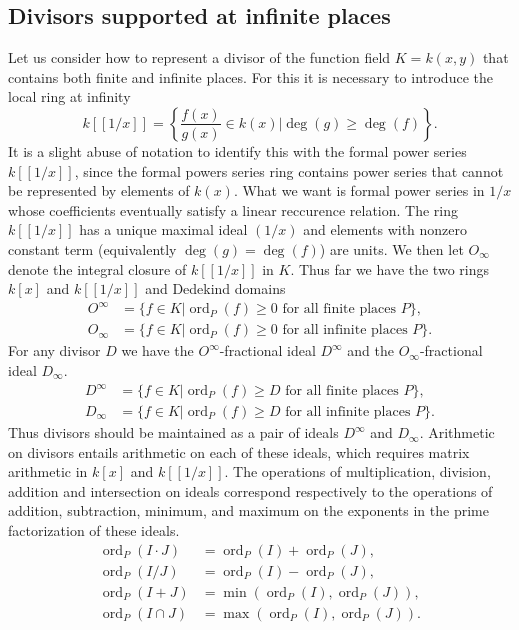 \documentclass[12pt,reqno]{amsart}
\numberwithin{equation}{section}
\begin{document}
\subsection{Divisors supported at infinite places}
\label{section_infdiv}
Let us consider how to represent a divisor of the function field $K=k(x,y)$ that contains both finite and infinite places. For this it is necessary to introduce the local ring at infinity
\begin{equation*}
 k[[1/x]] = \left\{ \frac{f(x)}{g(x)}\in k(x) \Big|\operatorname{deg}(g) \ge \operatorname{deg}(f) \right\}\text{.}
\end{equation*}
It is a slight abuse of notation to identify this with the formal power series $k[[1/x]]$, since the formal powers series ring contains power series that cannot be represented by elements of $k(x)$. What we want is formal power series in $1/x$ whose coefficients eventually satisfy a linear reccurence relation. The ring $k[[1/x]]$ has a unique maximal ideal $(1/x)$ and elements with nonzero constant term (equivalently $\operatorname{deg}(g) = \operatorname{deg}(f)$) are units. We then let $O_{\infty}$ denote the integral closure of $k[[1/x]]$ in $K$. Thus far we have the two rings $k[x]$ and $k[[1/x]]$ and Dedekind domains
\begin{align*}
 O^{\infty} &= \{ f \in K | \operatorname{ord}_P(f) \ge 0 \text{ for all finite places } P\}\text{,}\\
 O_{\infty} &= \{ f \in K | \operatorname{ord}_P(f) \ge 0 \text{ for all infinite places } P\}\text{.}
\end{align*}
For any divisor $D$ we have the $O^{\infty}$-fractional ideal $D^{\infty}$ and the $O_{\infty}$-fractional ideal $D_{\infty}$.
\begin{equation}
\label{def_idealsD}
\begin{alignedat}{3}
 D^{\infty} &= \{ f \in K | \operatorname{ord}_P(f) \ge D \text{ for all finite places } P\}\text{,}\\
 D_{\infty} &= \{ f \in K | \operatorname{ord}_P(f) \ge D \text{ for all infinite places } P\}\text{.}
\end{alignedat} 
\end{equation}
Thus divisors should be maintained as a pair of ideals $D^{\infty}$ and $D_{\infty}$. Arithmetic on divisors entails arithmetic on each of these ideals, which requires matrix arithmetic in $k[x]$ and $k[[1/x]]$. The operations of multiplication, division, addition and intersection on ideals correspond respectively to the operations of addition, subtraction, minimum, and maximum on the exponents in the prime factorization of these ideals.
\begin{align*}
 \operatorname{ord}_P(I \cdot J) &= \operatorname{ord}_P(I)+\operatorname{ord}_P(J)\text{,}\\
 \operatorname{ord}_P(I / J) &= \operatorname{ord}_P(I)-\operatorname{ord}_P(J)\text{,}\\
 \operatorname{ord}_P(I + J) &= \operatorname{min}(\operatorname{ord}_P(I), \operatorname{ord}_P(J))\text{,}\\
 \operatorname{ord}_P(I \cap J) &= \operatorname{max}(\operatorname{ord}_P(I),\operatorname{ord}_P(J))\text{.}
\end{align*}
\end{document}
